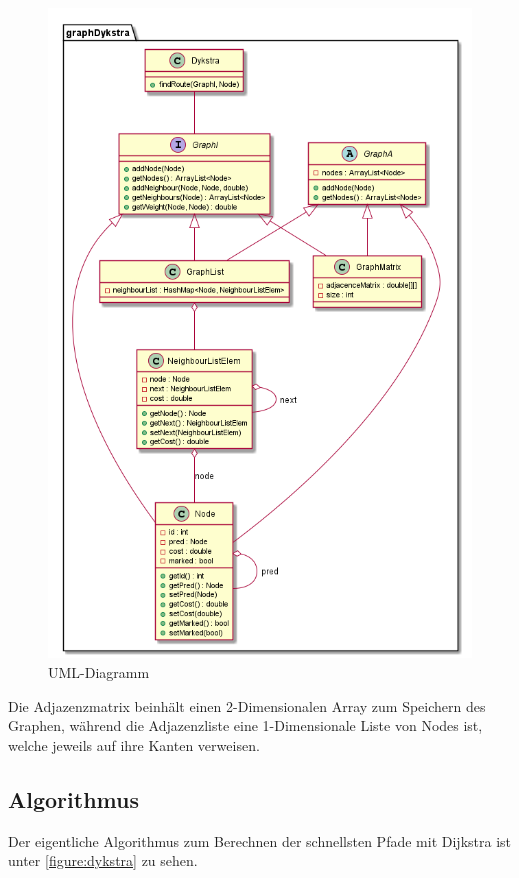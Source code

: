 \documentclass[11pt]{scrartcl}
\begin{document}
\begin{figure}
\includegraphics[width=\linewidth]{A9.png}
\caption{UML-Diagramm}
\label{figure:uml}
\end{figure}

		Die Adjazenzmatrix beinhält einen 2-Dimensionalen Array zum Speichern des Graphen, während die Adjazenzliste eine 1-Dimensionale Liste von Nodes ist, welche jeweils auf ihre Kanten verweisen.

	\subsection{Algorithmus}
		\label{sec:algo}

		Der eigentliche Algorithmus zum Berechnen der schnellsten Pfade mit Dijkstra ist unter \ref{figure:dykstra} zu sehen.
\end{document}

